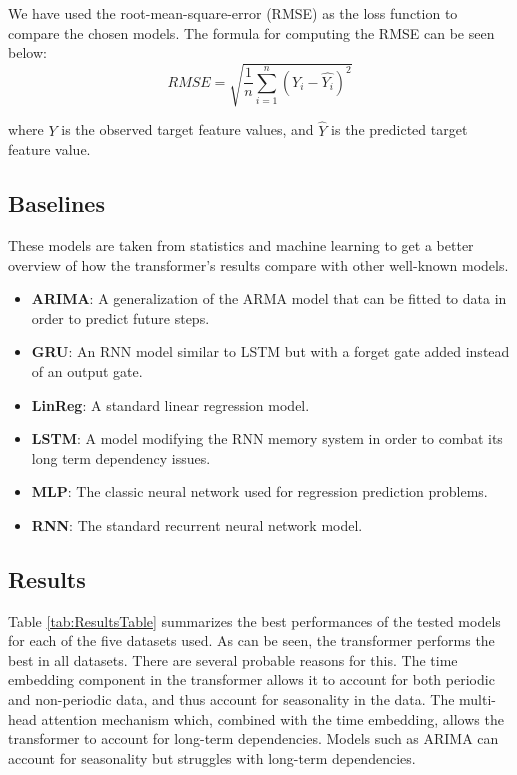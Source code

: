 We have used the root-mean-square-error (RMSE) as the loss function to compare the chosen models.
The formula for computing the RMSE can be seen below: 
$$RMSE = \sqrt{\frac 1 n \displaystyle\sum_{i=1}^n(Y_i - \hat{Y_i})^2}$$

where $Y$ is the observed target feature values, and $\hat{Y}$ is the predicted target feature value.

\subsection{Baselines}

These models are taken from statistics and machine learning to get a better overview of how the transformer's results compare with other well-known models.
\begin{itemize}
    \item \textbf{ARIMA}\cite{ARIMA-book}: A generalization of the ARMA model that can be fitted to data in order to predict future steps.
    \item \textbf{GRU}\cite{GRU-paper}: An RNN model similar to LSTM but with a forget gate added instead of an output gate.
    \item \textbf{LinReg}: A standard linear regression model.
    \item \textbf{LSTM}\cite{LSTMPaper}: A model modifying the RNN memory system in order to combat its long term dependency issues.
    \item \textbf{MLP}\cite{MLP-paper}: The classic neural network used for regression prediction problems.
    \item \textbf{RNN}\cite{RNN-paper}: The standard recurrent neural network model.
\end{itemize}

\subsection{Results}\label{sec:results}
Table \ref{tab:ResultsTable} summarizes the best performances of the tested models for each of the five datasets used. 
As can be seen, the transformer performs the best in all datasets. 
There are several probable reasons for this. 
The time embedding component in the transformer allows it to account for both periodic and non-periodic data, and thus account for seasonality in the data. 
The multi-head attention mechanism which, combined with the time embedding, allows the transformer to account for long-term dependencies. Models such as ARIMA can account for seasonality but struggles with long-term dependencies. 

